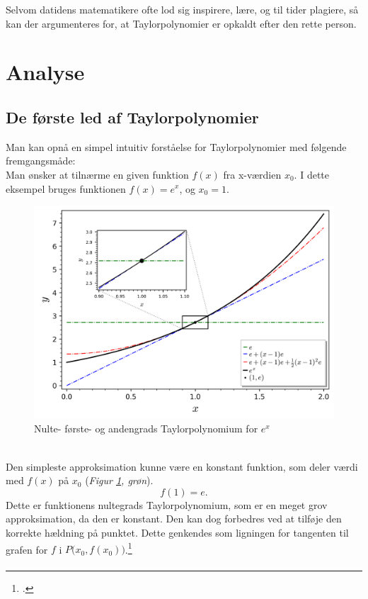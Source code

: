 \documentclass[12pt, a4paper]{article}
\begin{document}
\begin{refsection}
Selvom datidens matematikere ofte lod sig inspirere, lære, og til tider plagiere, så kan der argumenteres for, at Taylorpolynomier er opkaldt efter den rette person.
\section{Analyse} %
\subsection{De første led af Taylorpolynomier}
Man kan opnå en simpel intuitiv forståelse for Taylorpolynomier med følgende fremgangsmåde:\\
Man ønsker at tilnærme en given funktion $f(x)$ fra x-værdien $x_0$. I dette eksempel bruges funktionen $f(x)=e^x$, og $x_0=1$.
\begin{figure}[h]
     \includegraphics[width=\textwidth]{figures/ex-eksempel.png}
     \caption{Nulte- første- og andengrads Taylorpolynomium for $e^x$}
     \label{fig:ex-012tpol}
\end{figure}
\\Den simpleste approksimation kunne være en konstant funktion, som deler værdi med $f(x)$ på $x_0$ (\textit{Figur \ref{fig:ex-012tpol}, grøn}).
\[
f(1)=e
.\] 
Dette er funktionens nultegrads Taylorpolynomium, som er en meget grov approksimation, da den er konstant. Den kan dog forbedres ved at tilføje den korrekte hældning på punktet. Dette genkendes som ligningen for tangenten til grafen for $f$ i $P\big(x_0,f(x_0)\big)$.\footcite[s. 24, frml. 130]{formelsamling}
\[
\begin{aligned}

\end{aligned}\]
\end{refsection}
\end{document}
